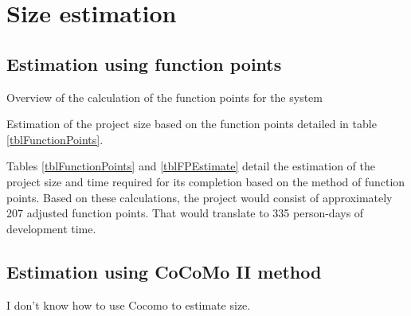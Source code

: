 \section{Size estimation}
\subsection{Estimation using function points}

\begin{table}[hbtp]
\centering

\caption{Overview of the calculation of the function points for the system}
\label{tblFunctionPoints}
\end{table}

\begin{table}[hbtp]
\centering

\caption{Estimation of the project size based on the function points detailed in table \ref{tblFunctionPoints}.}
\label{tblFPEstimate}
\end{table}

Tables \ref{tblFunctionPoints} and \ref{tblFPEstimate} detail the estimation of the project size and time required for its completion based on the method of function points. Based on these calculations, the project would consist of approximately 207 adjusted function points. That would translate to 335 person-days of development time.

\subsection{Estimation using CoCoMo II method}

I don't know how to use Cocomo to estimate size.

